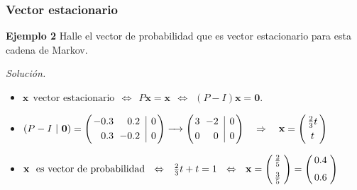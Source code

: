 {\nologo 
\begin{frame}\frametitle{Vector estacionario}
	
	\begin{ej}{\textbf{Ejemplo 2}}
		Halle el vector de probabilidad que es vector estacionario para esta cadena de Markov.
	\end{ej}	
	
	\textit{Solución.}
	
    
    \vspace{2mm}
	\begin{itemize}
		
		\item $\mathbf{x} \ \ \text{vector  estacionario} \ \ \Longleftrightarrow  \ \ P\mathbf{x}=\mathbf{x} 
		\ \  \Longleftrightarrow \ \ (P-I)\mathbf{x}=\mathbf{0}$.
		
		\vspace{8mm}
		\item $
		(P-I \ | \ \mathbf{0})
		=
		\left(
		\begin{array}{@{\hspace{0.2\tabcolsep}}r@{\hspace{\tabcolsep}}r@{\hspace{\tabcolsep}}|r@{\hspace{0.2\tabcolsep}}}
			-0.3 &  0.2 & 0  \\[1mm]
			 0.3 & -0.2 & 0
		\end{array}
		\right) 
		\xrightarrow[]{\phantom{xx} }		
		\left(
		\begin{array}{@{\hspace{0.2\tabcolsep}}r@{\hspace{\tabcolsep}}r@{\hspace{\tabcolsep}}|r@{\hspace{0.2\tabcolsep}}}
			3 & -2 & 0  \\[1mm]
			0 & 0 & 0
		\end{array}
		\right) 
		\quad \Rightarrow \quad 
		\mathbf{x} = 
		\left(
		\begin{array}{@{\hspace{0.3\tabcolsep}}c@{\hspace{0.3\tabcolsep}}}
			\frac{2}{3}t   \\[1mm]
			t 
		\end{array}
		\right) 
		$
		
		\vspace{8mm}
		\item $\mathbf{x} \ \ \text{es vector de probabilidad} \ \ \Leftrightarrow  \ \ \frac{2}{3}t+t=1
		\ \  \Leftrightarrow \ \ \mathbf{x} = 
		\left(
		\begin{array}{@{\hspace{0.3\tabcolsep}}r@{\hspace{0.5\tabcolsep}}}
		\frac{2}{5}   \\[2mm]
		\frac{3}{5} 
		\end{array}
		\right) 
		=
		\left(
		\begin{array}{@{\hspace{0.3\tabcolsep}}r@{\hspace{0.5\tabcolsep}}}
		0.4   \\[2mm]
		0.6
		\end{array}
		\right) 
		$
		

\end{itemize}
\end{frame}}
